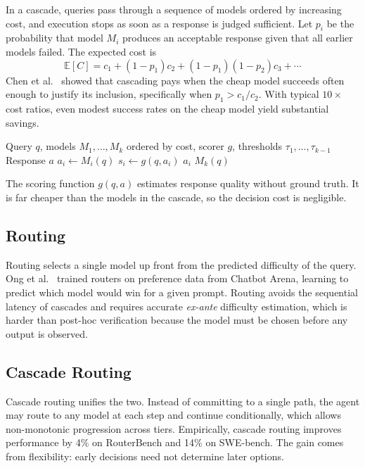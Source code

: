 \documentclass[11pt]{book}
\begin{document}
In a cascade, queries pass through a sequence of models ordered by increasing cost, and execution stops as soon as a response is judged sufficient. Let $p_i$ be the probability that model $M_i$ produces an acceptable response given that all earlier models failed. The expected cost is
\[
\mathbb{E}[C] = c_1 + (1-p_1)c_2 + (1-p_1)(1-p_2)c_3 + \cdots
\]
Chen et al.\ \cite{chen2023frugalgpt} showed that cascading pays when the cheap model succeeds often enough to justify its inclusion, specifically when $p_1 > c_1 / c_2$. With typical $10\times$ cost ratios, even modest success rates on the cheap model yield substantial savings.

\begin{algorithm}
\caption{LLM Cascade with Learned Routing}
\begin{algorithmic}[1]
\Require Query $q$, models $M_1, \ldots, M_k$ ordered by cost, scorer $g$, thresholds $\tau_1, \ldots, \tau_{k-1}$
\Ensure Response $a$
    \State $a_i \gets M_i(q)$
    \State $s_i \gets g(q, a_i)$
        \State \Return $a_i$
    \EndIf
\EndFor
\State \Return $M_k(q)$
\end{algorithmic}
\end{algorithm}

The scoring function $g(q, a)$ estimates response quality without ground truth. It is far cheaper than the models in the cascade, so the decision cost is negligible.

\subsection{Routing}

Routing selects a single model up front from the predicted difficulty of the query. Ong et al.\ \cite{ong2025routellm} trained routers on preference data from Chatbot Arena, learning to predict which model would win for a given prompt. Routing avoids the sequential latency of cascades and requires accurate \textit{ex-ante} difficulty estimation, which is harder than post-hoc verification because the model must be chosen before any output is observed.

\subsection{Cascade Routing}

Cascade routing \cite{dekoninck2025cascade} unifies the two. Instead of committing to a single path, the agent may route to any model at each step and continue conditionally, which allows non-monotonic progression across tiers. Empirically, cascade routing improves performance by 4\% on RouterBench and 14\% on SWE-bench. The gain comes from flexibility: early decisions need not determine later options.
\end{document}
